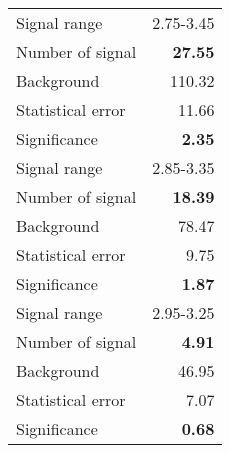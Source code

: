  {\large{
 \begin{tabular}{||l r||}
 \hline
 \hline
Signal range &      2.75-3.45 \\
Number of signal &  \textbf{  27.55} \\
Background &         110.32 \\
Statistical error &   11.66 \\
Significance &      \textbf{   2.35} \\
 \hline
Signal range &      2.85-3.35 \\
Number of signal &  \textbf{  18.39} \\
Background &          78.47 \\
Statistical error &    9.75 \\
Significance &      \textbf{   1.87} \\
 \hline
Signal range &      2.95-3.25 \\
Number of signal &  \textbf{   4.91} \\
Background &          46.95 \\
Statistical error &    7.07 \\
Significance &      \textbf{   0.68} \\
 \hline
 \hline
 \end{tabular}
 }}
 \endinput
